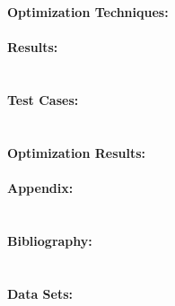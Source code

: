 \documentclass[11pt, oneside]{article}
\begin{document}
\section{}
\paragraph
{\bfseries Optimization Techniques:}

\pagebreak
\paragraph
{\bfseries Results:}

\section{}
\paragraph
{\bfseries Test Cases:}

\section{}
\paragraph
{\bfseries Optimization Results:}

\pagebreak
\paragraph
{\bfseries Appendix:}

\section{}
\paragraph
{\bfseries Bibliography:}

\section{}
\paragraph
{\bfseries Data Sets:}

\subsection{}
\end{document}
